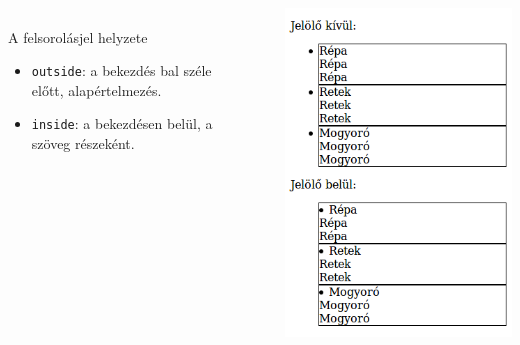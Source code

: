 %
\begin{frame}
  \begin{columns}[c]
      \begin{description}[m]
        \item[\texttt{list-style-position}] \hfill \\ A felsorolásjel helyzete\\
        \begin{itemize}
          \item \texttt{outside}: a bekezdés bal széle előtt, alapértelmezés.
          \item \texttt{inside}: a bekezdésen belül, a szöveg részeként.
        \end{itemize}
      \end{description}
      \vfill
      \begin{exampleblock}{}
        \scriptsize
        
      \end{exampleblock}
      \includegraphics[width=\textwidth]{kivulbelul.png}
  \end{columns} 
\end{frame}

